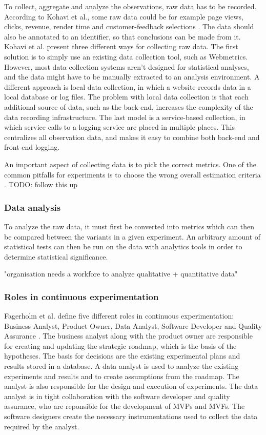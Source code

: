 \documentclass[english]{tktltiki2}
\theoremstyle{definition}
\theoremstyle{remark}
\begin{document}
To collect, aggregate and analyze the observations, raw data has to be recorded. According to Kohavi et al., some raw data could be for example page views, clicks, revenue, render time and customer-feedback selections \cite{kohavi2007practical}. The data should also be annotated to an identifier, so that conclusions can be made from it. Kohavi et al. present three different ways for collecting raw data. The first solution is to simply use an existing data collection tool, such as Webmetrics. However, most data collection systems aren't designed for statistical analyses, and the data might have to be manually extracted to an analysis environment. A different approach is local data collection, in which a website records data in a local database or log files. The problem with local data collection is that each additional source of data, such as the back-end, increases the complexity of the data recording infrastructure. The last model is a service-based collection, in which service calls to a logging service are placed in multiple places. This centralizes all observation data, and makes it easy to combine both back-end and front-end logging.

An important aspect of collecting data is to pick the correct metrics. One of the common pitfalls for experiments is to choose the wrong overall estimation criteria \cite{crook2009seven}. TODO: follow this up  

\subsubsection{Data analysis}
To analyze the raw data, it must first be converted into metrics which can then be compared between the variants in a given experiment. An arbitrary amount of statistical tests can then be run on the data with analytics tools in order to determine statistical significance. 

"organisation needs a workfore to analyze qualitative + quantitative data"

\subsubsection{Roles in continuous experimentation}
Fagerholm et al. define five different roles in continuous experimentation: Business Analyst, Product Owner, Data Analyst, Software Developer and Quality Assurance \cite{fagerholm2014building}. The business analyst along with the product owner are responsible for creating and updating the strategic roadmap, which is the basis of the hypotheses. The basis for decisions are the existing experimental plans and results stored in a database. A data analyst is used to analyze the existing experiments and results and to create assumptions from the roadmap. The analyst is also responsible for the design and execution of experiments. The data analyst is in tight collaboration with the software developer and quality assurance, who are reponsible for the development of MVPs and MVFs. The software designers create the necessary instrumentations used to collect the data required by the analyst.
\end{document}
